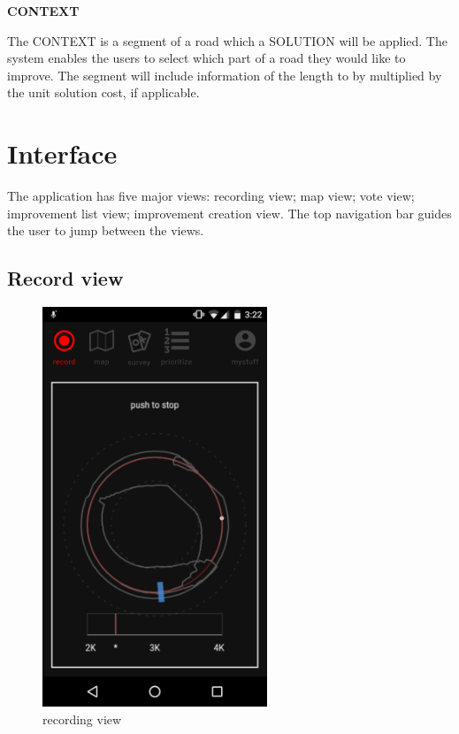 \textbf{CONTEXT}

The CONTEXT is a segment of a road which a SOLUTION will be applied. The system enables the users to select which part of a road they would like to improve. The segment will include information of the length to by multiplied by the unit solution cost, if applicable.


\section{Interface}

The application has five major views: recording view; map view; vote view; improvement list view; improvement creation view.
The top navigation bar guides the user to jump between the views.


\subsection{Record view}

\begin{figure}[!htb]
  \includegraphics[width=0.6\textwidth]{chapters/4/fig/interface_recording.png}
  \caption[interface: Record]{recording view}
  \label{fig:interface_record}
\end{figure}

